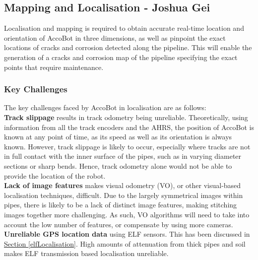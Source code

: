 \documentclass[11pt]{article}		%
\newcommand{\sectref}[1]{\hyperref[#1]{Section \ref*{#1}}}     %
\begin{document}
		\subsection[Mapping and Localisation]{Mapping and Localisation - Joshua Gei} \label{localisationSection}
		
		Localisation and mapping is required to obtain accurate real-time location and orientation of AccoBot in three dimensions, as well as pinpoint the exact locations of cracks and corrosion detected along the pipeline. This will enable the generation of a cracks and corrosion map of the pipeline specifying the exact points that require maintenance. 
		

		\subsubsection{Key Challenges}
		
		The key challenges faced by AccoBot in localisation are as follows: 
        \\
        \hspace*{3ex}\textbf{Track slippage} results in track odometry being unreliable. Theoretically, using information from all the track encoders and the AHRS, the position of AccoBot is known at any point of time, as its speed as well as its orientation is always known. However, track slippage is likely to occur, especially where tracks are not in full contact with the inner surface of the pipes, such as in varying diameter sections or sharp bends. Hence, track odometry alone would not be able to provide the location of the robot. 
        \\
        \hspace*{3ex}\textbf{Lack of image features} makes visual odometry (VO), or other visual-based localisation techniques, difficult. Due to the largely symmetrical images within pipes, there is likely to be a lack of distinct image features, making stitching images together more challenging. As such, VO algorithms will need to take into account the low number of features, or compensate by using more cameras. 
        \\
        \hspace*{3ex}\textbf{Unreliable GPS location data} using ELF sensors. This has been discussed in \sectref{elfLocalisation}. High amounts of attenuation from thick pipes and soil makes ELF transmission based localisation unreliable. 
\end{document}
